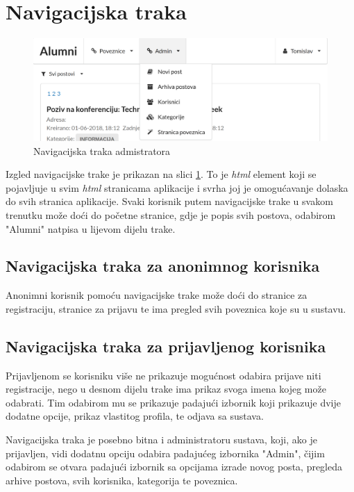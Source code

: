 \documentclass[zavrsni, numeric]{fer}
\begin{document}
\section{Navigacijska traka}

\begin{figure}[H]
	\centering
	\includegraphics[width=13cm]{slike/nav-admin.png}
	\caption{Navigacijska traka admistratora}
	\label{fig:nav-admin}
\end{figure}

Izgled navigacijske trake je prikazan na slici \ref{fig:nav-admin}. To je \textit{html} element koji se pojavljuje u svim \textit{html} stranicama aplikacije i svrha joj je omogućavanje dolaska do svih stranica aplikacije. Svaki korisnik putem navigacijske trake u svakom trenutku može doći do početne stranice, gdje je popis svih postova, odabirom "Alumni" natpisa u lijevom dijelu trake. 

\subsection{Navigacijska traka za anonimnog korisnika}
Anonimni korisnik pomoću navigacijske trake može doći do stranice za registraciju, stranice za prijavu te ima pregled svih poveznica koje su u sustavu. 

\subsection{Navigacijska traka za prijavljenog korisnika}
Prijavljenom se korisniku više ne prikazuje mogućnost odabira prijave niti registracije, nego u desnom dijelu trake ima prikaz svoga imena kojeg može odabrati. Tim odabirom mu se prikazuje padajući izbornik koji prikazuje dvije dodatne opcije, prikaz vlastitog profila, te odjava sa sustava.

Navigacijska traka je posebno bitna i administratoru sustava, koji, ako je prijavljen, vidi dodatnu opciju odabira padajućeg izbornika "Admin", čijim odabirom se otvara padajući izbornik sa opcijama izrade novog posta, pregleda arhive postova, svih korisnika, kategorija te poveznica.
\end{document}
